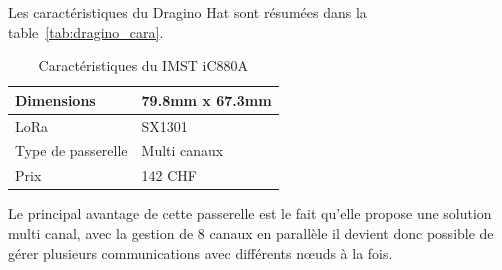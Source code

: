 Les caractéristiques du Dragino Hat sont résumées dans la table~\ref{tab:dragino_cara}.

\begin{table}[htb]
\caption[IMST iC880A Caractéristiques]{Caractéristiques du IMST iC880A}
\label{tab:imst_cara}
\centering
\begin{tabular}{ l | l }
\toprule
Dimensions & 79.8mm x 67.3mm \\
\midrule
LoRa & SX1301 \\
\midrule
Type de passerelle & Multi canaux \\
\midrule
Prix & 142 CHF \\
\bottomrule
\end{tabular}
\end{table}

Le principal avantage de cette passerelle est le fait qu’elle propose une solution multi canal, avec la gestion de 8 canaux en parallèle il devient donc possible de gérer plusieurs communications avec différents nœuds à la fois.
